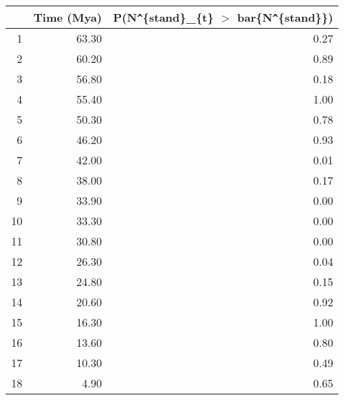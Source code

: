 \begin{table}[ht]
\centering
\begin{tabular}{rrr}
  \hline
 & Time (Mya) & P(N\verb|^|\{stand\}\_\{t\} $>$ bar\{N\verb|^|\{stand\}\}) \\ 
  \hline
1 & 63.30 & 0.27 \\ 
  2 & 60.20 & 0.89 \\ 
  3 & 56.80 & 0.18 \\ 
  4 & 55.40 & 1.00 \\ 
  5 & 50.30 & 0.78 \\ 
  6 & 46.20 & 0.93 \\ 
  7 & 42.00 & 0.01 \\ 
  8 & 38.00 & 0.17 \\ 
  9 & 33.90 & 0.00 \\ 
  10 & 33.30 & 0.00 \\ 
  11 & 30.80 & 0.00 \\ 
  12 & 26.30 & 0.04 \\ 
  13 & 24.80 & 0.15 \\ 
  14 & 20.60 & 0.92 \\ 
  15 & 16.30 & 1.00 \\ 
  16 & 13.60 & 0.80 \\ 
  17 & 10.30 & 0.49 \\ 
  18 & 4.90 & 0.65 \\ 
   \hline
\end{tabular}
\label{tab:div_peak}
\end{table}
